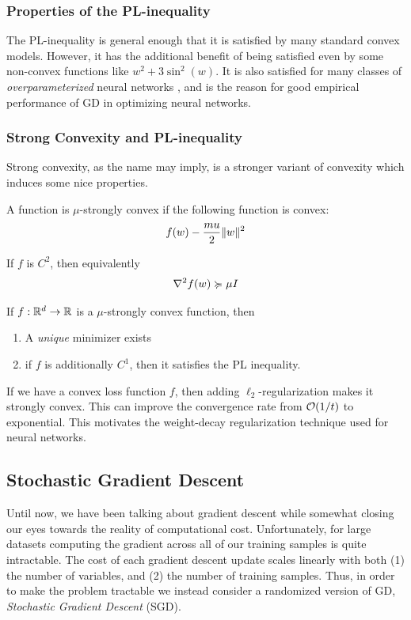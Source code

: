 \subsubsection{Properties of the PL-inequality}
The PL-inequality is general enough that it is satisfied by many standard convex models. However, it has the additional benefit of being satisfied even by some non-convex functions like $w^2 + 3\sin^2(w)$. It is also satisfied for many classes of {\em overparameterized} neural networks \cite{liu2020toward}, and is the reason for good empirical performance of GD in optimizing neural networks.

\subsubsection{Strong Convexity and PL-inequality}
Strong convexity, as the name may imply, is a stronger variant of convexity which induces some nice properties.
\begin{defn}
A function is $\mu$-strongly convex if the following function is convex:
\begin{align*}
    f(w) - \frac{mu}{2}\lVert w \rVert^2
\end{align*}

If $f$ is $C^2$, then equivalently
\begin{align*}
    \nabla^2 f(w) \succcurlyeq \mu I
\end{align*}
\end{defn}
\begin{prop}
If $f: \mathbb{R}^d \to \mathbb{R}$ is a $\mu$-strongly convex function, then
\begin{enumerate}
    \item A {\em unique} minimizer exists
    \item if $f$ is additionally $C^1$, then it satisfies the PL inequality.
\end{enumerate}
\end{prop}
If we have a convex loss function $f$, then adding $\ell_2$-regularization makes it strongly convex. This can improve the convergence rate from $\mathcal{O}(1/t)$ to exponential. This motivates the weight-decay regularization technique used for neural networks.

\subsection{Stochastic Gradient Descent}
Until now, we have been talking about gradient descent while somewhat closing our eyes towards the reality of computational cost. Unfortunately,
for large datasets computing the gradient across all of our training samples is quite intractable. The cost of each gradient descent update scales linearly
with both (1) the number of variables, and (2) the number of training samples. Thus, in order to make the problem tractable we instead consider
a randomized version of GD, {\em Stochastic Gradient Descent} (SGD).

